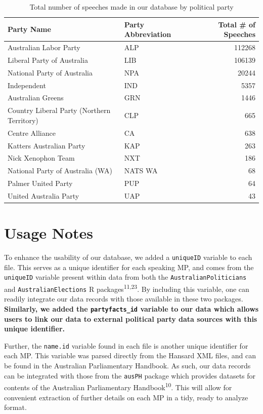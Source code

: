 \documentclass[
  letterpaper,
  DIV=11,
  numbers=noendperiod]{scrartcl}
\begin{document}
\hypertarget{tbl-speeches_by_party}{}
\begin{table}[H]
\caption{\label{tbl-speeches_by_party}Total number of speeches made in our database by political party }\tabularnewline

\centering
\begin{tabular}{llr}
\toprule
Party Name & Party Abbreviation & Total \# of Speeches\\
\midrule
Australian Labor Party & ALP & 112268\\
Liberal Party of Australia & LIB & 106139\\
National Party of Australia & NPA & 20244\\
Independent & IND & 5357\\
Australian Greens & GRN & 1446\\
\addlinespace
Country Liberal Party (Northern Territory) & CLP & 665\\
Centre Alliance & CA & 638\\
Katters Australian Party & KAP & 263\\
Nick Xenophon Team & NXT & 186\\
National Party of Australia (WA) & NATS WA & 68\\
\addlinespace
Palmer United Party & PUP & 64\\
United Australia Party & UAP & 43\\
\bottomrule
\end{tabular}
\end{table}

\hypertarget{sec-usage}{%
\section{Usage Notes}\label{sec-usage}}

To enhance the usability of our database, we added a \texttt{uniqueID}
variable to each file. This serves as a unique identifier for each
speaking MP, and comes from the \texttt{uniqueID} variable present
within data from both the \texttt{AustralianPoliticians} and
\texttt{AustralianElections} R packages\textsuperscript{11,23}. By
including this variable, one can readily integrate our data records with
those available in these two packages. \textbf{Similarly, we added the
\texttt{partyfacts\_id} variable to our data which allows users to link
our data to external political party data sources with this unique
identifier.}

Further, the \texttt{name.id} variable found in each file is another
unique identifier for each MP. This variable was parsed directly from
the Hansard XML files, and can be found in the Australian Parliamentary
Handbook. As such, our data records can be integrated with those from
the \texttt{ausPH} package which provides datasets for contents of the
Australian Parliamentary Handbook\textsuperscript{10}. This will allow
for convenient extraction of further details on each MP in a tidy, ready
to analyze format.
\end{document}
